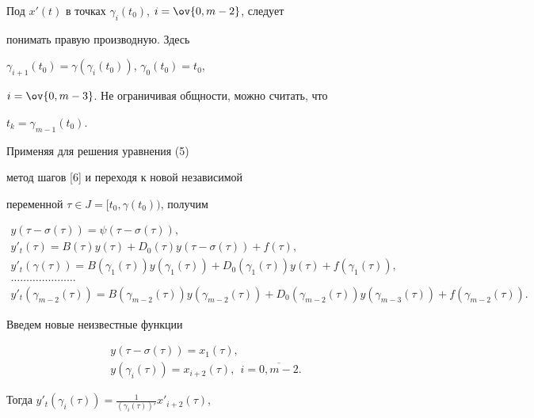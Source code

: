 Под $x'(t)$ в точках $\gamma_i(t_0)$, $i=\ov{0,m-2}$, следует


понимать правую производную. Здесь


$\gamma_{i+1}(t_0)=\gamma(\gamma_i(t_0))$, $\gamma_0(t_0)=t_0$,


$i=\ov{0,m-3}$. Не ограничивая общности, можно считать, что


$t_k=\gamma_{m-1}(t_0)$.





Применяя для решения уравнения (5) 


метод шагов [6] и переходя к новой независимой 


переменной $\tau \in J= [t_0,\gamma(t_0))$, получим


\begin{gather*}


y(\tau-\sigma(\tau))=\psi(\tau-\sigma(\tau)), \\


%


y'_t(\tau)=B(\tau)y(\tau)+D_0(\tau)y(\tau-\sigma(\tau))+f(\tau), \\


%


y'_t(\gamma(\tau))=B(\gamma_1(\tau))y(\gamma_1(\tau))+


D_0(\gamma_1(\tau))y(\tau)+f(\gamma_1(\tau)), \\


%


\dotsc\dotsc\dotsc\dotsc\dotsc\dotsc\dotsc \\


%


y'_t(\gamma_{m-2}(\tau))=B(\gamma_{m-2}(\tau))y(\gamma_{m-2}(\tau))+


D_0(\gamma_{m-2}(\tau))y(\gamma_{m-3}(\tau))+f(\gamma_{m-2}(\tau)).


\end{gather*}


Введем новые неизвестные функции


\begin{gather*}


y(\tau-\sigma(\tau))=x_1(\tau), \\


%


y(\gamma_i(\tau))=x_{i+2}(\tau),\ \ i=\overline{0,m-2}.


\end{gather*}


Тогда $y'_t(\gamma_i(\tau))=\frac{1}{(\gamma_i(\tau))'} x'_{i+2}(\tau)$,


